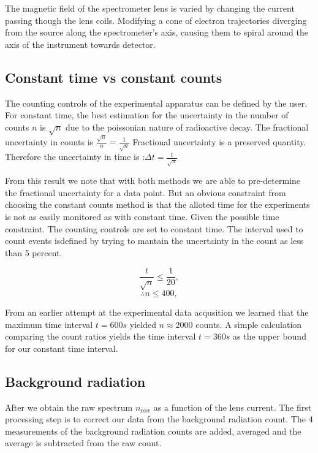 \documentclass[10pt, a4paper]{article}
\begin{document}
\begin{multicols}{2}
The magnetic field of the spectrometer lens is varied by changing the current passing though the lens coils.
Modifying a cone of electron trajectories diverging from the source along the spectrometer's axis, causing them to spiral around the axis of the instrument towards detector\cite{SPA}. 

\subsection{Constant time vs constant counts}

The counting controls of the experimental apparatus can be defined by the user.
For constant time, the best estimation for the uncertainty in the number of counts $n$ is $\sqrt{n}$\cite{SPA} due to the poissonian nature of radioactive decay. 
The fractional uncertainty in counts is $\frac{\sqrt{n}}{n} = \frac{1}{\sqrt{n}}$
Fractional uncertainty is a preserved quantity. Therefore the uncertainty in time
is :$ \Delta t = \frac{t}{\sqrt{n}}$ 

From this result we note that with both methods we are able to pre-determine the fractional uncertainty for a data point. 
But an obvious constraint from choosing the constant counts method is that the alloted time for the experiments is not as easily monitored as with constant time. 
Given the possible time constraint. The counting controls are set to constant time. 
The interval used to count events isdefined by trying to mantain the uncertainty in the count as less than 5 percent.

\begin{equation}\frac{t}{\sqrt{n}} \leq \frac{1}{20},
\end{equation}
\begin{equation}\therefore n \leq 400,
\end{equation}

From an earlier attempt at the experimental data acqusition we learned that the maximum time interval $t = 600s$ yielded  $n \approx 2000$ counts. A simple calculation comparing the count ratios yields the time interval $t = 360s$ as the upper bound for our constant time interval.

\subsection{Background radiation}

After we obtain the raw spectrum $n_{\mathrm raw}$ as a function of the lens current. The first processing step is to correct our data from the background radiation count.
The 4 measurements of the background radiation counts are added, averaged and the average is subtracted from the raw count.


\end{multicols}
\end{document}
